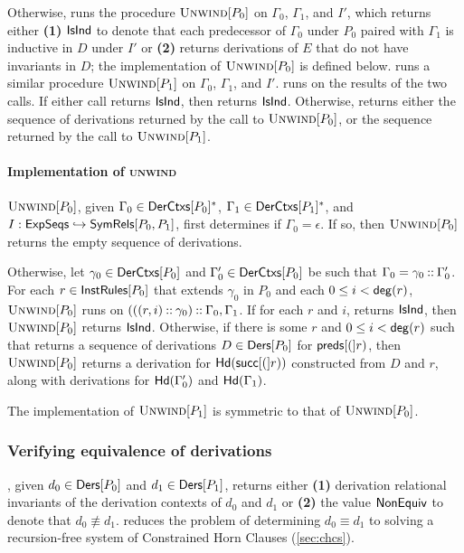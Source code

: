 Otherwise, \chkindaux runs the procedure $\textsc{Unwind}[ P_0 ]$ on $\Gamma_0$,
$\Gamma_1$, and $I'$, which returns either \textbf{(1)} $\mathsf{IsInd}$ to
denote that each predecessor of $\Gamma_0$ under $P_0$
%
%
paired with $\Gamma_1$ is inductive in $D$ under $I'$ or %
\textbf{(2)} returns derivations of $E$ that do not have invariants in
$D$;
%
the implementation of $\textsc{Unwind}[ P_0 ]$ is defined below.
%
\chkindaux runs a similar procedure $\textsc{Unwind}[ P_1 ]$ on $\Gamma_0$,
$\Gamma_1$, and $I'$.
\chkindaux runs \chooseres on the results of the two calls.
%
If either call returns $\mathsf{IsInd}$, then \chooseres returns $\mathsf{IsInd}$.
%
Otherwise, \chooseres returns either the sequence of derivations
returned by the call to $\textsc{Unwind}[ P_0 ]$, or the sequence returned by
the call to $\textsc{Unwind}[ P_1 ]$.

\paragraph{Implementation of \textsc{unwind}}
%
$\textsc{Unwind}[ P_0 ]$, given $\Gamma_0 \in \mathsf{DerCtxs}[ P_0 ]^{*}$, $\Gamma_1 \in
\mathsf{DerCtxs}[ P_1 ]^{*}$, and $I : \mathsf{ExpSeqs} \hookrightarrow \mathsf{SymRels}[ P_0, P_1 ]$,
first determines if $\Gamma_0 = \epsilon$.
%
If so, then $\textsc{Unwind}[ P_0 ]$ returns the empty sequence of derivations.

Otherwise, let $\gamma_0 \in \mathsf{DerCtxs}[ P_0 ]$ and $\Gamma_0' \in
\mathsf{DerCtxs}[ P_0 ]$ be such that $\Gamma_0 = \gamma_0 \mathbin{::} \Gamma_0'$.
%
For each $r \in \mathsf{InstRules}[  P_0  ]$ that extends $\gamma_0$ in $P_0$
and each $0 \leq i < \mathsf{deg}(r)$, $\textsc{Unwind}[ P_0 ]$ runs \chkindaux on
$(((r, i) \mathbin{::} \gamma_0) \mathbin{::} \Gamma_0, \Gamma_1$.
%
If for each $r$ and $i$, \chkindaux returns $\mathsf{IsInd}$, then
$\textsc{Unwind}[ P_0 ]$ returns $\mathsf{IsInd}$.
%
Otherwise, if there is some $r$ and $0 \leq i < \mathsf{deg}(r)$ such
that \chkindaux returns a sequence of derivations $D \in \mathsf{Ders}[ P_0 ]$
for $\mathsf{preds}[ ( ]r)$, then $\textsc{Unwind}[ P_0 ]$ returns a derivation for
$\mathsf{Hd}(\mathsf{succ}[ ( ]r))$ constructed from $D$ and $r$, along with
derivations for $\mathsf{Hd}(\Gamma_0')$ and $\mathsf{Hd}(\Gamma_1)$.

The implementation of $\textsc{Unwind}[ P_1 ]$ is symmetric to that of
$\textsc{Unwind}[ P_0 ]$.

\subsubsection{Verifying equivalence of derivations}
\label{sec:verify-ders}
%
\verifyders, given $d_0 \in \mathsf{Ders}[  P_0  ]$ and %
$d_1 \in \mathsf{Ders}[  P_1  ]$, returns either \textbf{(1)} derivation
relational invariants of the derivation contexts of $d_0$ and $d_1$
or %
\textbf{(2)} the value $\mathsf{NonEquiv}$ to denote that $d_0 \not\equiv
d_1$.
%
\verifyders reduces the problem of determining $d_0 \equiv d_1$ to
solving a recursion-free system of Constrained Horn Clauses
(\autoref{sec:chcs}).


